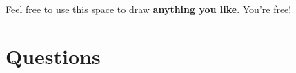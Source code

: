 \documentclass[addpoints,12pt]{exam}
\begin{document}
{\small
\vqword{}
\begin{center}
\gradetable[v][questions]
\end{center}
}

\vspace{\fill}

\begin{center}
  Feel free to use this space to draw \textbf{anything you like}. You're free! \\

  \vspace{10pt}

  \fbox{\rule{6in}{0pt}\rule[-0.5ex]{0pt}{2.5in}}
\end{center}


\newpage


\section*{Questions}
\end{document}
